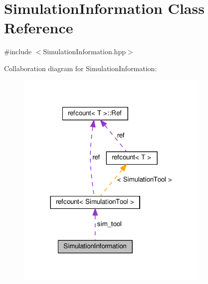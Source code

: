 \hypertarget{classSimulationInformation}{}\section{Simulation\+Information Class Reference}
\label{classSimulationInformation}


{\ttfamily \#include $<$Simulation\+Information.\+hpp$>$}



Collaboration diagram for Simulation\+Information\+:
\nopagebreak
\begin{figure}[H]
\begin{center}
\leavevmode
\includegraphics[width=263pt]{de/dff/classSimulationInformation__coll__graph}
\end{center}
\end{figure}

